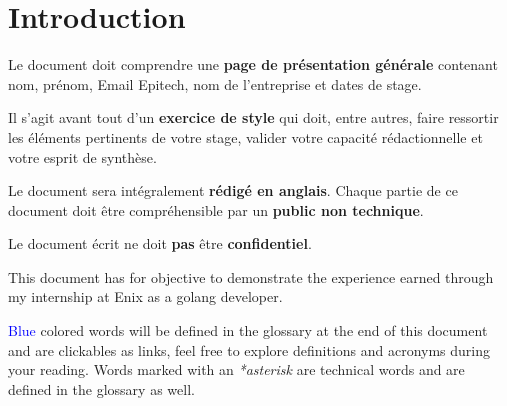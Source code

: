\chapter{Introduction}

\color{red}
Le document doit comprendre une \textbf{page de présentation générale} contenant nom, prénom, Email Epitech, nom de l’entreprise et dates de stage.

Il s’agit avant tout d’un \textbf{exercice de style} qui doit, entre autres, faire ressortir les éléments
pertinents de votre stage, valider votre capacité rédactionnelle et votre esprit de synthèse.

Le document sera intégralement \textbf{rédigé en anglais}. Chaque partie de ce document doit être
compréhensible par un \textbf{public non technique}.

Le document écrit ne doit \textbf{pas} être \textbf{confidentiel}.
\color{black}

This document has for objective to demonstrate the experience earned through my internship at Enix as a golang developer.

\textcolor{blue}{Blue} colored words will be defined in the glossary at the end of this document and are clickables as links, feel free to explore definitions and acronyms during your reading. Words marked with an \emph{*asterisk} are technical words and are defined in the glossary as well.

\clearpage
